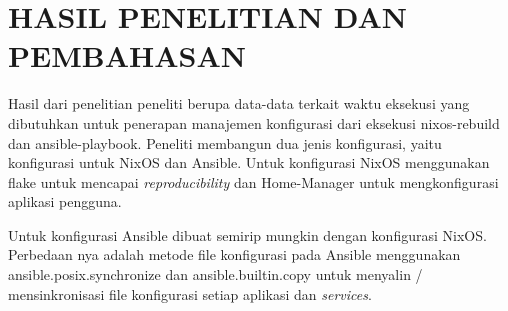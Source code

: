 \documentclass[10pt,]{report}
\begin{document}
\chapter{HASIL PENELITIAN DAN PEMBAHASAN}
Hasil dari penelitian peneliti berupa data-data terkait waktu eksekusi yang
dibutuhkan untuk penerapan manajemen konfigurasi dari eksekusi nixos-rebuild
dan ansible-playbook. Peneliti membangun dua jenis konfigurasi, yaitu
konfigurasi untuk NixOS dan Ansible. Untuk konfigurasi NixOS menggunakan flake
untuk mencapai \textit{reproducibility} dan Home-Manager untuk mengkonfigurasi
aplikasi pengguna.

Untuk konfigurasi Ansible dibuat semirip mungkin dengan konfigurasi NixOS.
Perbedaan nya adalah metode file konfigurasi pada Ansible menggunakan
ansible.posix.synchronize dan ansible.builtin.copy untuk menyalin /
mensinkronisasi file konfigurasi setiap aplikasi dan \textit{services}.
\vspace{3mm}
\end{document}
